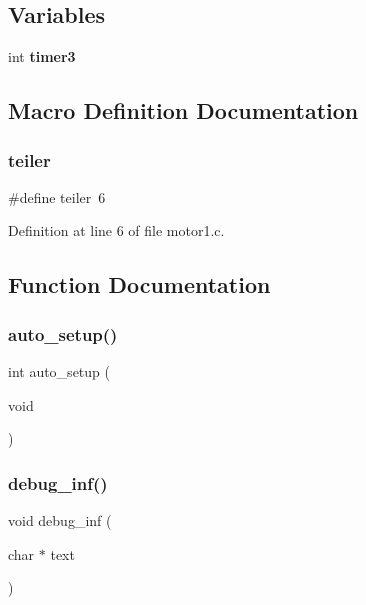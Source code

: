 \subsection*{Variables}
\begin{DoxyCompactItemize}
\item 
int \textbf{ timer3}
\end{DoxyCompactItemize}


\subsection{Macro Definition Documentation}
\mbox{\label{motor1_8c_a8ee1c24f8ad0420c26e3dd186db99e27}} 
\subsubsection{teiler}
{\footnotesize\ttfamily \#define teiler~6}



Definition at line 6 of file motor1.\+c.



\subsection{Function Documentation}
\mbox{\label{motor1_8c_a74908ae0608550a6106b2d9348f1cb86}} 
\subsubsection{auto\+\_\+setup()}
{\footnotesize\ttfamily int auto\+\_\+setup (\begin{DoxyParamCaption}\item[{void}]{ }\end{DoxyParamCaption})}

\mbox{\label{motor1_8c_afb3a2ffa2014ea9d37ba91c6072d18aa}} 
\subsubsection{debug\+\_\+inf()}
{\footnotesize\ttfamily void debug\+\_\+inf (\begin{DoxyParamCaption}\item[{char $\ast$}]{text }\end{DoxyParamCaption})}



